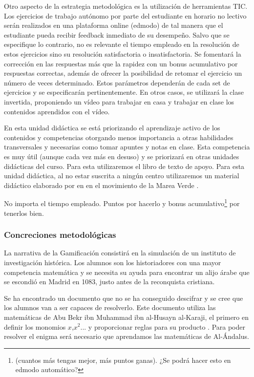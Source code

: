 Otro aspecto de la  estrategia metodológica es la utilización de herramientas \gls{TIC}.
%
Los ejercicios de trabajo autónomo por parte del estudiante en horario no lectivo serán realizados en una plataforma online (edmodo) de tal manera que el estudiante pueda recibir feedback inmediato de su desempeño.
%
Salvo que se especifique lo contrario, no es relevante el tiempo empleado en la resolución de estos ejercicios sino su resolución satisfactoria o insatisfactoria.
%
Se fomentará la corrección en las respuestas más que la rapidez con un bonus acumulativo por respuestas correctas, además de ofrecer la posibilidad de retomar el ejercicio un número de veces determinado.
%
Estos parámetros dependerán de cada set de ejercicios y se especificarán pertinentemente.
%
En otros casos, se utilizará la clase invertida, proponiendo un vídeo para trabajar en casa y trabajar en clase los contenidos aprendidos con el vídeo.


En esta unidad didáctica se está priorizando el aprendizaje activo de los contenidos y competencias otorgando menos importancia a otras habilidades transversales y necesarias como tomar apuntes y notas en clase. 
%
Esta competencia es muy útil (aunque cada vez más en desuso) y se priorizará en otras unidades didácticas del curso. 
%
Para esta utilizaremos el libro de texto de apoyo. Para esta unidad didáctica, al no estar suscrita a ningún centro utilizaremos un material didáctico elaborado por \citeauthor{MareaVerde} en \citeyear{MareaVerde} en el movimiento de la Marea Verde \citep{MareaVerde}.

No importa el tiempo empleado. 
%
Puntos por hacerlo y bonus acumulativo\footnote{(cuantos más tengas mejor, más puntos ganas). ¿Se podrá hacer esto en edmodo automático?} por tenerlos bien.


\subsubsection{Concreciones metodológicas}

La narrativa de la Gamificación consistirá en la simulación de un instituto de investigación histórica.
%
Los alumnos son los historiadores con una mayor competencia matemática y se necesita su ayuda para encontrar un alijo árabe que se escondió en Madrid en 1083, justo antes de la reconquista cristiana.

Se ha encontrado un documento que no se ha conseguido descifrar y se cree que los alumnos van a ser capaces de resolverlo.
%
%
Este documento utiliza las matemáticas de Abu Bekr ibn Muhammad ibn al-Husayn al-Karaji, el primero en definir los monomios $x$,$x^2$... y proporcionar reglas para su producto \citep{MatArabe}.
%
Para poder resolver el enigma será necesario que aprendamos las matemáticas de Al-Ándalus.

